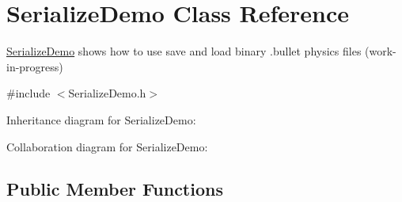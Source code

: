 \hypertarget{class_serialize_demo}{\section{Serialize\+Demo Class Reference}
\label{class_serialize_demo}
}


\hyperlink{class_serialize_demo}{Serialize\+Demo} shows how to use save and load binary .bullet physics files (work-\/in-\/progress)  




{\ttfamily \#include $<$Serialize\+Demo.\+h$>$}



Inheritance diagram for Serialize\+Demo\+:


Collaboration diagram for Serialize\+Demo\+:
\subsection*{Public Member Functions}
